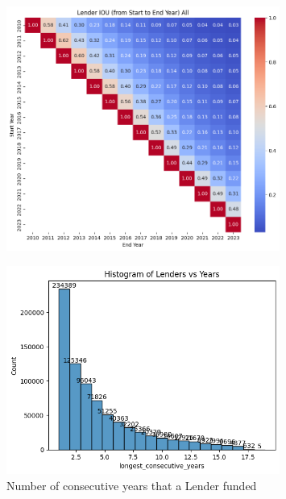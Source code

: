 \begin{figure}[H]
	\centering
	\includegraphics[width=0.8\textwidth]{images/active-fromto.png}
	\caption{}
	\label{fig:active-fromto}
\end{figure}

\begin{figure}[H]
	\centering
	\includegraphics[width=0.8\textwidth]{images/active-hist.png}
	\caption{Number of consecutive years that a Lender funded}
	\label{fig:active-hist}
\end{figure}
